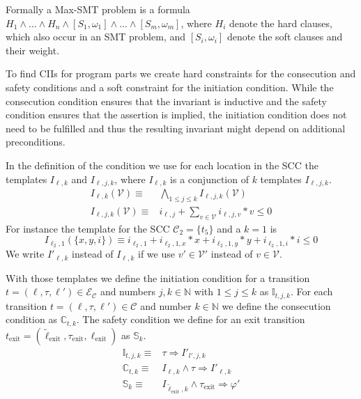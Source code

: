 Formally a Max-SMT problem is a formula $H_1 \wedge \dots \wedge H_n \wedge [S_1,\omega_1] \wedge \dots \wedge [S_m,\omega_m]$, where $H_i$ denote the hard clauses, which also occur in an SMT problem, and $[S_i,\omega_i]$ denote the soft clauses and their weight.

To find CIIs for program parts we create hard constraints for the consecution and safety conditions and a soft constraint for the initiation condition.
While the consecution condition ensures that the invariant is inductive and the safety condition ensures that the assertion is implied, the initiation condition does not need to be fulfilled and thus the resulting invariant might depend on additional preconditions.  

In the definition of the condition we use for each location in the SCC the templates $I_{\ell,k}$ and $I_{\ell,j,k}$, where $I_{\ell,k}$ is a conjunction of $k$ templates $I_{\ell,j,k}$.
\begin{align}
  I_{\ell,k}(\mathcal{V}) \equiv & \bigwedge_{1 \leq j \leq k}{I_{\ell,j,k}(\mathcal{V})}\\
  I_{\ell,j,k}(\mathcal{V}) \equiv & i_{\ell,j} + \sum_{v \in \mathcal{V}}{i_{\ell,j,v} * v} \leq 0
\end{align}
For instance the template for the SCC $\mathcal{C}_2 = \lbrace t_5 \rbrace$ and a $k=1$ is \[ I_{\ell_2,1}(\lbrace x, y, i \rbrace) \equiv i_{\ell_2,1} + i_{\ell_2,1,x} * x + i_{\ell_2,1,y} * y + i_{\ell_2,1,i} * i \leq 0 \]
We write $I'_{\ell,k}$ instead of $I_{\ell,k}$ if we use $v' \in \mathcal{V}'$ instead of $v \in \mathcal{V}$.

With those templates we define the initiation condition for a transition $t = (\ell, \tau, \ell') \in \mathcal{E}_\mathcal{C}$ and numbers $j, k \in \mathbb{N}$ with $1 \leq j \leq k$ as $\mathbb{I}_{t,j,k}$.
For each transition $t = (\ell, \tau, \ell') \in \mathcal{C}$ and number $k \in \mathbb{N}$ we define the consecution condition as $\mathbb{C}_{t,k}$.
The safety condition we define for an exit transition $t_\text{exit} = (\tilde{\ell}_\text{exit}, \tau_\text{exit}, \ell_\text{exit})$ as $\mathbb{S}_k$.
\begin{align}
  \mathbb{I}_{t,j,k} \equiv & \tau \Rightarrow I'_{l',j,k}\\
  \mathbb{C}_{t,k} \equiv & I_{\ell,k} \wedge \tau \Rightarrow I'_{\ell,k}\\
  \mathbb{S}_k \equiv & I_{\tilde{\ell}_\text{exit},k} \wedge \tau_\text{exit} \Rightarrow \varphi'
\end{align}

